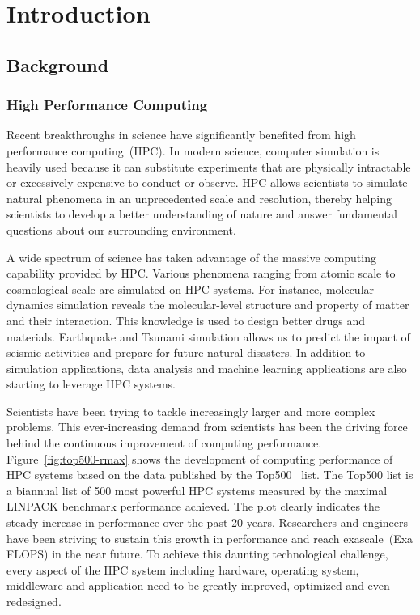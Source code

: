 \chapter{Introduction}\label{sec:i}

\section{Background}\label{sec:i-background}

\subsection{High Performance Computing}

Recent breakthroughs in science have significantly benefited from high
performance computing~(HPC). In modern science, computer simulation is heavily
used because it can substitute experiments that are physically intractable
or excessively expensive to conduct or observe. HPC allows scientists to
simulate natural phenomena in an unprecedented scale and resolution, thereby
helping scientists to develop a better understanding of nature and answer
fundamental questions about our surrounding environment.

A wide spectrum of science has taken advantage of the massive computing
capability provided by HPC\@. Various phenomena ranging from atomic scale to
cosmological scale are simulated on HPC systems. For instance, molecular
dynamics simulation reveals the molecular-level structure and property of
matter and their interaction. This knowledge is used to design better drugs
and materials. Earthquake and Tsunami simulation allows us to predict the
impact of seismic activities and prepare for future natural disasters. In
addition to simulation applications, data analysis and machine learning
applications are also starting to leverage HPC systems.

Scientists have been trying to tackle increasingly larger and more complex
problems. This ever-increasing demand from scientists has been the driving
force behind the continuous improvement of computing performance.
Figure~\ref{fig:top500-rmax} shows the development of computing performance of
HPC systems based on the data published by the Top500~\autocite{top500} list.
The Top500 list is a biannual list of 500 most powerful HPC systems measured
by the maximal LINPACK benchmark performance achieved. The plot clearly
indicates the steady increase in performance over the past 20 years.
Researchers and engineers have been striving to sustain this growth in
performance and reach exascale~(Exa FLOPS) in the near future. To achieve this
daunting technological challenge, every aspect of the HPC system including
hardware, operating system, middleware and application need to be greatly
improved, optimized and even redesigned.

